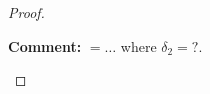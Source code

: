 \documentclass{article}
\newenvironment{comment}
  {\par\medskip
   \color{red}%
   \begin{framed}
   \textbf{Comment: }\ignorespaces}
 {\end{framed}
  \medskip}
\theoremstyle{case}
\numberwithin{theorem}{subsection}
\newcommand{\dk}{\Delta_k}
\newcommand{\maxgrad}{{M_{\nabla}}}
\newcommand{\maxhessian}{{M_{\nabla^2}}}
\begin{document}
\begin{proof}




\begin{comment}
$ = \ldots$ where $\delta_2 = ?$.
\end{comment}


% 
% 




\end{proof}
\end{document}
